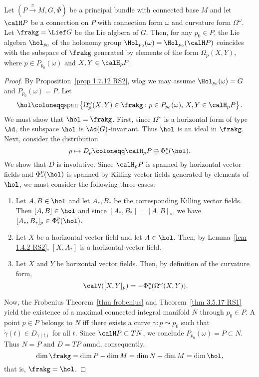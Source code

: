 \begin{thm}\label{thm 1.7.15 RS2 Ambrose-Singer}
    Let $(P\overset{\pi}{\to}M,G,\Phi)$ be a principal bundle with connected base $M$ and let $\calH P$ be a connection on $P$ with connection form $\omega$ and curvature form $\Omega^\omega$. Let $\frakg=\Lief G$ be the Lie algbera of $G$. Then, for any $p_0\in P$, the Lie algebra $\hol_{p_0}$ of the holonomy group $\Hol_{p_0}(\omega)=\Hol_{p_0}(\calH P)$ coincides with the subspace of $\frakg$ generated by elements of the form $\Omega_p(X,Y)$, where $p\in P_{p_0}(\omega)$ and $X,Y\in\calH_p P$.
\end{thm}
\begin{proof}
    By Proposition~\ref{prop 1.7.12 RS2}, \gls{wlog} we may assume $\Hol_{p_0}(\omega)=G$ and $P_{p_0}(\omega)=P$. Let
    \[\hol\coloneqq \mathrm{span}\left\{\Omega^\omega_p(X,Y)\in\frakg : p\in P_{p_0}(\omega),\, X,Y\in\calH_p P\right\}.\]
    We must show that $\hol=\frakg$. First, since $\Omega^\omega$ is a horizontal form of type $\Ad$, the subspace $\hol$ is $\Ad(G)$-invariant. Thus $\hol$ is an ideal in $\frakg$. Next, consider the distribution
    \[p\mapsto D_p\coloneqq \calH_pP \oplus \Phi^p_\ast(\hol).\]
    We show that $D$ is involutive. Since $\calH_p P$ is spanned by horizontal vector fields and $\Phi^p_\ast(\hol)$ is spanned by Killing vector fields generated by elements of $\hol$, we must consider the following three cases:
    \begin{enumerate}[label=(\alph*)]
        \item Let $A,B\in\hol$ and let  $A_\ast,B_\ast$ be the corresponding Killing vector fields. Then $[A,B]\in\hol$ and since $[A_\ast,B_\ast]=[A,B]_\ast$, we have $[A_\ast,B_\ast]_p\in \Phi^p_\ast(\hol)$.
        \item Let $X$ be a horizontal vector field and let $A\in\hol$. Then, by Lemma~\ref{lem 1.4.2 RS2}, $[X,A_\ast]$ is a horizontal vector field.
        \item Let $X$ and $Y$ be horizontal vector fields. Then, by definition of the curvature form,
        \[\calV([X,Y]_p)=-\Phi^p_\ast(\Omega^\omega(X,Y)).\]
    \end{enumerate}
    Now, the Frobenius Theorem~\ref{thm frobenius} and Theorem~\ref{thm 3.5.17 RS1} yield the existence of a maximal connected integral manifold $N$ through $p_0\in P$. A point $p\in P$ belongs to $N$ iff there exists a curve $\gamma:p\leadsto p_0$ such that $\dot\gamma(t)\in D_{\gamma(t)}$ for all $t$. Since $\calH P\subset TN$, we conclude $P_{p_0}(\omega)=P\subset N$. Thus $N=P$ and $D=TP$ amnd, consequently,
    \[\dim\frakg=\dim P-\dim M=\dim N-\dim M=\dim\hol,\]
    that is, $\frakg=\hol$.
\end{proof}

